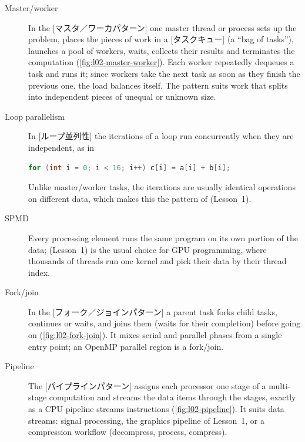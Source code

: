 \documentclass[../main.tex]{subfiles}
\begin{document}
\begin{description}
  \item[Master/worker]  In the [マスタ／ワーカパターン]
    one master thread or process sets up the problem, places the pieces of
    work in a [タスクキュー] (a \enquote{bag of tasks}),
    launches a pool of workers, waits, collects their results and
    terminates the computation (\cref{fig:l02-master-worker}).  Each worker
    repeatedly dequeues a task and runs it; since workers take the next
    task as soon as they finish the previous one, the load balances itself.
    The pattern suits work that splits into independent pieces of unequal
    or unknown size.
  \item[Loop parallelism]  In [ループ並列性] the
    iterations of a loop run concurrently when they are independent, as in
\begin{lstlisting}[language=C++, numbers=none]
for (int i = 0; i < 16; i++) c[i] = a[i] + b[i];
\end{lstlisting}
    Unlike master/worker tasks, the iterations are usually identical
    operations on different data, which makes this the pattern of
     (Lesson~1).
  \item[SPMD]  Every processing element runs the same program on its own
    portion of the data;  (Lesson~1) is the usual choice for GPU
    programming, where thousands of threads run one kernel and pick their
    data by their thread index.
  \item[Fork/join]  In the [フォーク／ジョインパターン]
    a parent task forks child tasks, continues or waits, and joins them
    (waits for their completion) before going on
    (\cref{fig:l02-fork-join}).  It mixes serial and parallel phases from
    a single entry point; an OpenMP parallel region is a fork/join.
  \item[Pipeline]  The [パイプラインパターン]
    assigns each processor one stage of a multi-stage computation and
    streams the data items through the stages, exactly as a CPU pipeline
    streams instructions (\cref{fig:l02-pipeline}).  It suits data
    streams: signal processing, the graphics pipeline of Lesson~1, or a
    compression workflow (decompress, process, compress).
\end{description}
\end{document}
